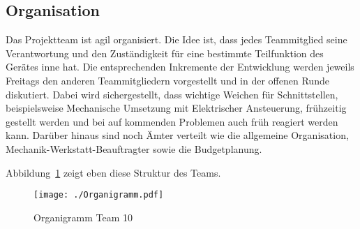 \documentclass[main.tex]{subfiles} %
\begin{document}

\subsection{Organisation}

Das Projektteam ist agil organisiert. Die Idee ist, dass jedes Teammitglied
seine Verantwortung und den Zuständigkeit für eine bestimmte Teilfunktion des
Gerätes inne hat. Die entsprechenden Inkremente der Entwicklung werden jeweils
Freitags den anderen Teammitgliedern vorgestellt und in der offenen Runde
diskutiert. Dabei wird sichergestellt, dass wichtige Weichen für
Schnittstellen, beispielsweise Mechanische Umsetzung mit Elektrischer
Ansteuerung, frühzeitig gestellt werden und bei auf kommenden Problemen auch
früh reagiert werden kann. Darüber hinaus sind noch Ämter verteilt wie die
allgemeine Organisation, Mechanik-Werkstatt-Beauftragter sowie die
Budgetplanung.

Abbildung~\ref{fig:Organigramm} zeigt eben diese Struktur des Teams.

\begin{figure}[h!]
    \centering
    \texttt{[image: ./Organigramm.pdf]}
    \caption{Organigramm Team 10}\label{fig:Organigramm}
\end{figure}
\end{document}
